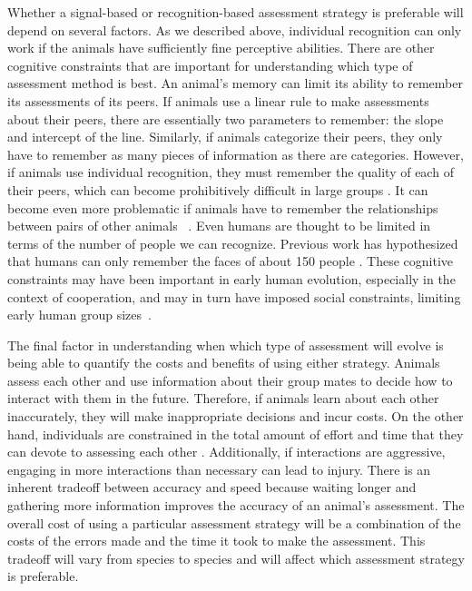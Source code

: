 Whether a signal-based or recognition-based assessment strategy is preferable will depend on several factors. As we described above, individual recognition can only work if the animals have sufficiently fine perceptive abilities. There are other cognitive constraints that are important for understanding which type of assessment method is best. An animal's memory can limit its ability to remember its assessments of its peers. 
If animals use a linear rule to make assessments about their peers, there are essentially two parameters to remember: the slope and intercept of the line. Similarly, if animals categorize their peers, they only have to remember as many pieces of information as there are categories. However, if animals use individual recognition, they must remember the quality of each of their peers, which can become prohibitively difficult in large groups  \citep{Rohwer:1982fk,Solberg:1997uq}. It can become even more problematic if animals have to remember the relationships between pairs of other animals ~\citep{Seyfarth2015SocialCognition}. Even humans are thought to be limited in terms of the number of people we can recognize. Previous work has hypothesized that humans can only remember the faces of about 150 people \citep{Dunbar:1993zr,Hill:2003ly}. These cognitive constraints may have been important in early human evolution, especially in the context of cooperation, and may in turn have imposed social constraints, limiting early human group sizes~\citep{Dunbar:1992ys,Dunbar:1993zr}. 

The final factor in understanding when which type of assessment will evolve is being able to quantify the costs and benefits of using either strategy. Animals assess each other and use information about their group mates to decide how to interact with them in the future. Therefore, if animals learn about each other inaccurately, they will make inappropriate decisions and incur costs. On the other hand, individuals are constrained in the total amount of effort and time that they can devote to assessing each other \citep{MacIver:2010ve}. Additionally, if interactions are aggressive, engaging in more interactions than necessary can lead to injury. There is an inherent tradeoff between accuracy and speed because waiting longer and gathering more information improves the accuracy of an animal's assessment. The overall cost of using a particular assessment strategy will be a combination of the costs of the errors made and the time it took to make the assessment. This tradeoff will vary from species to species and will affect which assessment strategy is preferable.  

